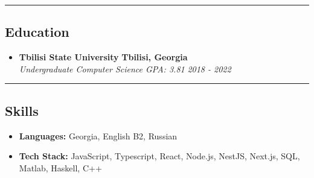 \documentclass[10pt,letterpaper]{article}
\begin{document}
\hrule
\vspace{-1.0em}
\subsection*{Education}
  \begin{itemize}
    \parskip=-1em
      \vspace{0.05em}

    \item[]
    {\textbf{Tbilisi State University}}
     \hfill
     \textbf{Tbilisi, Georgia}
    \\
    {\emph{Undergraduate Computer Science GPA: 3.81}
     \hfill
     \emph{2018 - 2022}}
  \end{itemize}

\hrule
\vspace{-1.0em}
\subsection*{Skills}
\begin{itemize}
  \parskip=-0.5em
  \vspace{0.05em}
  \item[] \textbf{Languages:} Georgia, English B2, Russian
  \vspace{0.5em}
  \item[] \textbf{Tech Stack:} JavaScript, Typescript, React, Node.js, NestJS, Next.js, SQL, Matlab, Haskell, C++
\end{itemize}
\end{document}
